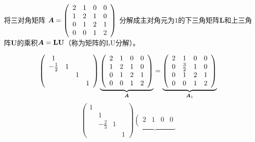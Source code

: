 \begin{frame}
  \begin{li}
    将三对角矩阵
    $
    \boldsymbol{A} = \left(
      \begin{array}{cccc}
        2 & 1 & 0 & 0\\
        1 & 2 & 1 & 0\\
        0 & 1 & 2 & 1\\
        0 & 0 & 1 & 2
      \end{array}
    \right)
    $
    分解成主对角元为$1$的下三角矩阵$\mathbf{L}$和上三角阵$\mathbf{U}$的乘积$\boldsymbol{A}=\mathbf{L}\mathbf{U}$（称为矩阵的LU分解）。
  \end{li}
\end{frame}


\begin{frame}
  \begin{small}
    \begin{jie}
      $$
      \left(
        \begin{array}{cccc}
          1 & && \\
          -\frac12 &1&&\\
            &&1&\\
            &&&1
        \end{array}
      \right)\underbrace{\left(
          \begin{array}{cccc}
            2 & 1 & 0 & 0\\
            1 & 2 & 1 & 0\\
            0 & 1 & 2 & 1\\
            0 & 0 & 1 & 2
          \end{array}
        \right)}_{\MA}=  \underbrace{\left(
          \begin{array}{cccc}
            2 & 1 & 0 & 0\\
            0 & \frac32 & 1 & 0\\
            0 & 1 & 2 & 1\\
            0 & 0 & 1 & 2
          \end{array}
        \right)}_{\MA_1}
      $$
      \pause
      $$
      \left(
        \begin{array}{cccc}
          1 & && \\
            &1&&\\
            &-\frac23&1&\\
            &&&1
        \end{array}
      \right)\underbrace{\left(
          \begin{array}{cccc}
            2 & 1 & 0 & 0\\

\end{array}}$$
\end{jie}
\end{small}
\end{frame}
